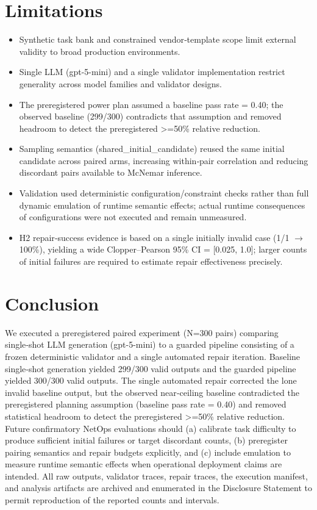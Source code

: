 \documentclass[conference]{IEEEtran}
\begin{document}
\section{Limitations}
\begin{itemize}
\item Synthetic task bank and constrained vendor‑template scope limit external validity to broad production environments.
\item Single LLM (gpt-5-mini) and a single validator implementation restrict generality across model families and validator designs.
\item The preregistered power plan assumed a baseline pass rate = 0.40; the observed baseline (299/300) contradicts that assumption and removed headroom to detect the preregistered >=50\% relative reduction.
\item Sampling semantics (shared\_initial\_candidate) reused the same initial candidate across paired arms, increasing within‑pair correlation and reducing discordant pairs available to McNemar inference.
\item Validation used deterministic configuration/constraint checks rather than full dynamic emulation of runtime semantic effects; actual runtime consequences of configurations were not executed and remain unmeasured.
\item H2 repair‑success evidence is based on a single initially invalid case (1/1 \ensuremath{\rightarrow} 100\%), yielding a wide Clopper--Pearson 95\% CI = [0.025, 1.0]; larger counts of initial failures are required to estimate repair effectiveness precisely.
\end{itemize}

\section{Conclusion}
We executed a preregistered paired experiment (N=300 pairs) comparing single‑shot LLM generation (gpt-5-mini) to a guarded pipeline consisting of a frozen deterministic validator and a single automated repair iteration. Baseline single‑shot generation yielded 299/300 valid outputs and the guarded pipeline yielded 300/300 valid outputs. The single automated repair corrected the lone invalid baseline output, but the observed near‑ceiling baseline contradicted the preregistered planning assumption (baseline pass rate = 0.40) and removed statistical headroom to detect the preregistered >=50\% relative reduction. Future confirmatory NetOps evaluations should (a) calibrate task difficulty to produce sufficient initial failures or target discordant counts, (b) preregister pairing semantics and repair budgets explicitly, and (c) include emulation to measure runtime semantic effects when operational deployment claims are intended. All raw outputs, validator traces, repair traces, the execution manifest, and analysis artifacts are archived and enumerated in the Disclosure Statement to permit reproduction of the reported counts and intervals.
\end{document}
